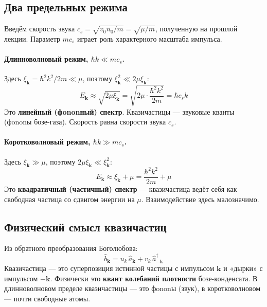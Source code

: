 \documentclass[../general/general]{subfiles}
\begin{document}
\subsection{Два предельных режима}

Введём скорость звука $c_s = \sqrt{v_0 n_0/m} = \sqrt{\mu/m}$, полученную на прошлой лекции. Параметр $mc_s$ играет роль характерного масштаба импульса.

\paragraph{Длинноволновый режим, $\hbar k \ll mc_s$.}
Здесь $\xi_\mathbf{k} = \hbar^2k^2/2m \ll \mu$, поэтому $\xi_\mathbf{k}^2 \ll 2\mu\xi_\mathbf{k}$:
\begin{equation}
    E_\mathbf{k} \approx \sqrt{2\mu\xi_\mathbf{k}} = \sqrt{2\mu\cdot\frac{\hbar^2k^2}{2m}} = \hbar c_s k
\end{equation}
Это \textbf{линейный (фononный) спектр}. Квазичастицы --- звуковые кванты (фononы бозе-газа). Скорость равна скорости звука $c_s$.

\paragraph{Коротковолновый режим, $\hbar k \gg mc_s$.}
Здесь $\xi_\mathbf{k} \gg \mu$, поэтому $2\mu\xi_\mathbf{k} \ll \xi_\mathbf{k}^2$:
\begin{equation}
    E_\mathbf{k} \approx \xi_\mathbf{k} + \mu = \frac{\hbar^2k^2}{2m} + \mu
\end{equation}
Это \textbf{квадратичный (частичный) спектр} --- квазичастица ведёт себя как свободная частица со сдвигом энергии на $\mu$. Взаимодействие здесь малозначимо.

\subsection{Физический смысл квазичастиц}

Из обратного преобразования Боголюбова:
\begin{equation}
    \hat{b}_\mathbf{k} = u_k\,\hat{a}_\mathbf{k} + v_k\,\hat{a}^\dagger_{-\mathbf{k}}
\end{equation}
Квазичастица --- это суперпозиция истинной частицы с импульсом $\mathbf{k}$ и «дырки» с импульсом $-\mathbf{k}$. Физически это \textbf{квант колебаний плотности} бозе-конденсата. В длинноволновом пределе квазичастицы --- это фononы (звук), в коротковолновом --- почти свободные атомы.
\end{document}

